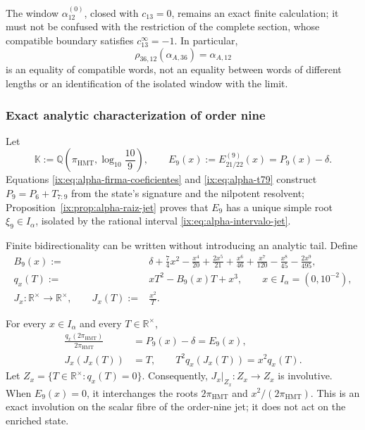 The window \(\alpha_{12}^{(0)}\), closed with \(c_{13}=0\), remains an
exact finite calculation; it must not be confused with the restriction of the
complete section, whose compatible boundary satisfies \(c_{13}^{\infty}=-1\). In
particular,
\begin{equation}
 \rho_{36,12}(\alpha_{A,36})=\alpha_{A,12}
 \label{ix:eq:alpha-rho-36-12-proyectiva}
\end{equation}
is an equality of compatible words, not an equality between words of
different lengths or an identification of the isolated window with the
limit.

\subsubsection{Exact analytic characterization of order nine}

Let
\[
 \mathbb K:=\mathbb Q\!\left(\pi_{\mathrm{HMT}},
                  \log_{10}\frac{10}{9}\right),
 \qquad
 E_9(x):=E_{21/22}^{(9)}(x)=P_9(x)-\delta .
\]
Equations \eqref{ix:eq:alpha-firma-coeficientes} and
\eqref{ix:eq:alpha-t79} construct \(P_9=P_6+T_{7:9}\) from the state's
signature and the nilpotent resolvent;
Proposition~\ref{ix:prop:alpha-raiz-jet} proves that \(E_9\) has a unique
simple root \(\xi_9\in I_\alpha\), isolated by the rational interval
\eqref{ix:eq:alpha-intervalo-jet}.

Finite bidirectionality can be written without introducing an analytic
tail. Define
\begin{align}
 B_9(x):={}&\delta+\frac74x^2-\frac{x^4}{20}
 +\frac{2x^5}{21}+\frac{x^6}{46}+\frac{x^7}{120}
 -\frac{x^8}{45}-\frac{2x^9}{495},
 \label{ix:eq:alpha-b9-finito}\\
 q_x(T):={}&xT^2-B_9(x)T+x^3,\qquad x\in I_\alpha=(0,10^{-2}),
 \label{ix:eq:alpha-q-involucion-finita}\\
 J_x:{\mathbb R}^{\times}\longrightarrow{\mathbb R}^{\times},
 \qquad J_x(T):={}&\frac{x^2}{T}.
\end{align}

\begin{proposition}
\label{ix:prop:alpha-involucion-finita-exacta}
For every \(x\in I_\alpha\) and every \(T\in\mathbb R^\times\),
\begin{align}
 \frac{q_x(2\pi_{\mathrm{HMT}})}{2\pi_{\mathrm{HMT}}}
 &=P_9(x)-\delta=E_9(x),
 \label{ix:eq:alpha-q-equivale-p9}\\
 J_x(J_x(T))&=T,
 \qquad
 T^2q_x(J_x(T))=x^2q_x(T).
 \label{ix:eq:alpha-j-involucion-exacta}
\end{align}
Let \(Z_x=\{T\in\mathbb R^\times:q_x(T)=0\}\). Consequently,
\(J_x|_{Z_x}:Z_x\to Z_x\) is involutive. When \(E_9(x)=0\),
it interchanges the roots \(2\pi_{\mathrm{HMT}}\) and
\(x^2/(2\pi_{\mathrm{HMT}})\). This is an exact involution on the scalar
fibre of the order-nine jet; it does not act on the enriched state.
\end{proposition}

